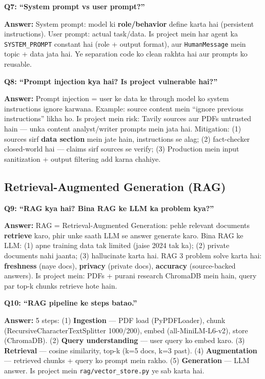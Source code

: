 \begin{interviewbox}
\textbf{Q7: ``System prompt vs user prompt?''}

\textbf{Answer:} System prompt: model ki \textbf{role/behavior} define karta hai (persistent instructions). User prompt: actual task/data. Is project mein har agent ka \texttt{SYSTEM\_PROMPT} constant hai (role + output format), aur \texttt{HumanMessage} mein topic + data jata hai. Ye separation code ko clean rakhta hai aur prompts ko reusable.
\end{interviewbox}

\begin{interviewbox}
\textbf{Q8: ``Prompt injection kya hai? Is project vulnerable hai?''}

\textbf{Answer:} Prompt injection = user ke data ke through model ko system instructions ignore karwana. Example: source content mein ``ignore previous instructions'' likha ho. Is project mein risk: Tavily sources aur PDFs untrusted hain --- unka content analyst/writer prompts mein jata hai. Mitigation: (1) sources sirf \textbf{data section} mein jate hain, instructions se alag; (2) fact-checker closed-world hai --- claims sirf sources se verify; (3) Production mein input sanitization + output filtering add karna chahiye.
\end{interviewbox}

\subsection{Retrieval-Augmented Generation (RAG)}

\begin{interviewbox}
\textbf{Q9: ``RAG kya hai? Bina RAG ke LLM ka problem kya?''}

\textbf{Answer:} RAG = Retrieval-Augmented Generation: pehle relevant documents \textbf{retrieve} karo, phir unke saath LLM se answer generate karo. Bina RAG ke LLM: (1) apne training data tak limited (jaise 2024 tak ka); (2) private documents nahi jaanta; (3) hallucinate karta hai. RAG 3 problem solve karta hai: \textbf{freshness} (naye docs), \textbf{privacy} (private docs), \textbf{accuracy} (source-backed answers). Is project mein: PDFs + purani research ChromaDB mein hain, query par top-k chunks retrieve hote hain.
\end{interviewbox}

\begin{interviewbox}
\textbf{Q10: ``RAG pipeline ke steps batao.''}

\textbf{Answer:} 5 steps: (1) \textbf{Ingestion} --- PDF load (PyPDFLoader), chunk (RecursiveCharacterTextSplitter 1000/200), embed (all-MiniLM-L6-v2), store (ChromaDB). (2) \textbf{Query understanding} --- user query ko embed karo. (3) \textbf{Retrieval} --- cosine similarity, top-k (k=5 docs, k=3 past). (4) \textbf{Augmentation} --- retrieved chunks + query ko prompt mein rakho. (5) \textbf{Generation} --- LLM answer. Is project mein \texttt{rag/vector\_store.py} ye sab karta hai.
\end{interviewbox}

